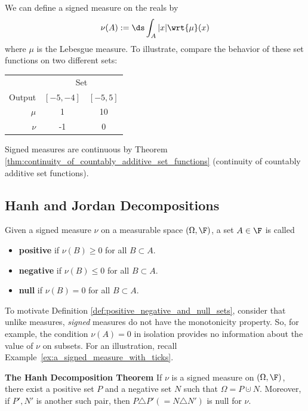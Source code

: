 \documentclass{article} %
\newcommand{\dmu}{\wrt{\mu}}
\begin{document}
\begin{example}
We can define a signed measure on the reals by 
\[ \nu(A) := \ds\int_A |x| \dmu(x) \]
where $\mu$ is the Lebesgue measure.    To illustrate, compare the behavior of these set functions on two different sets:

\begin{tabular}{rcc}
& \multicolumn{2}{c}{Set} \\
Output & $[-5,-4]$ & $[-5,5]$\\	
$\mu$ & 1 & 10\\
$\nu$ & -1 & 0\\
\end{tabular}
 	
\end{example}


\begin{remark}
Signed measures are continuous by Theorem \ref{thm:continuity_of_countably_additive_set_functions} (continuity of countably additive set functions).
\end{remark}

\subsection{Hanh and Jordan Decompositions}

\begin{definition}
Given a signed measure $\nu$ on a measurable space $(\Omega, \F)$, a set $A \in \F$ is called
\begin{itemize}
\item \textbf{positive} if $\nu(B) \geq 0$ for all $B \subset A$.
\item \textbf{negative} if $\nu(B) \leq 0$ for all $B \subset A$.
\item \textbf{null}	if $\nu(B) = 0$ for all $B \subset A$.
\end{itemize}
\label{def:positive_negative_and_null_sets}
\end{definition}

\begin{remark}
To motivate Definition \ref{def:positive_negative_and_null_sets}, consider that unlike measures, \textit{signed} measures do not have the monotonicity property. So, for example, the condition $\nu(A)=0$ in isolation provides no information about the value of $\nu$ on subsets. For an illustration, recall  Example~\ref{ex:a_signed_measure_with_ticks}.
\end{remark}

\begin{theorem}{\textbf{The Hanh Decomposition Theorem}}
If $\nu$ is a signed measure on $(\Omega, \F)$, there exist a positive set $P$ and a negative set $N$ such that $\Omega = P \cupdot N$.  Moreover, if $P',N'$ is another such pair, then $P \triangle P' (= N \triangle N')$ is null for $\nu$.
\label{thm:hanh_decomposition}
\end{theorem}
\end{document}
